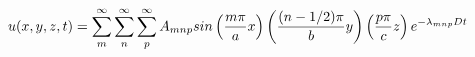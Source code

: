 \documentclass[10pt]{article}
\begin{document}
\begin{align*}u(x,y,z,t) = \sum_{m}^{\infty} \sum_{n}^{\infty}\sum_{p}^{\infty} A_{mnp} sin\left( \frac{m \pi}{a}x \right) \left( \frac{(n-1/2) \pi}{b}y \right)
\left( \frac{p \pi}{c}z \right) e^{-\lambda_{mnp} D t}\newline
\end{align*}
\end{document}
